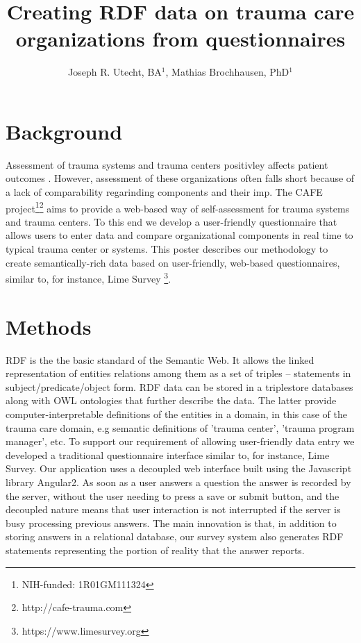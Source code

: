 \documentclass{amia}
\begin{document}
\title{Creating RDF data on trauma care organizations from questionnaires}

\author{Joseph R. Utecht, BA$^{1}$, Mathias Brochhausen, PhD$^{1}$}


\maketitle

\section*{Background}

Assessment of trauma systems and trauma centers positivley affects patient outcomes \cite{ref1, ref2}.
However, assessment of these organizations often falls short because of a lack of comparability regarinding components and their imp.
The CAFE project\footnote{NIH-funded: 1R01GM111324}\footnote{http://cafe-trauma.com} aims to provide a web-based way of self-assessment for trauma systems and trauma centers. 
To this end we develop a user-friendly questionnaire that allows users to enter data and compare organizational components in real time to typical trauma center or systems.
This poster describes our methodology to create semantically-rich data based on user-friendly, web-based questionnaires, similar to, for instance, Lime Survey \footnote{https://www.limesurvey.org}. 

\section*{Methods}
RDF is the the basic standard of the Semantic Web. It allows the linked representation of entities relations among them as a set of triples -- statements in subject/predicate/object form. RDF data can be stored in a triplestore databases along with OWL ontologies that further describe the data. The latter provide computer-interpretable definitions of the entities in  a domain, in this case of the trauma care domain, e.g semantic definitions of 'trauma center', 'trauma program manager', etc. 
To support our requirement of allowing user-friendly data entry we developed a traditional questionnaire interface similar to, for instance, Lime Survey\cite{TODO}. 
Our application uses a decoupled web interface built using the Javascript library Angular2\cite{TODO}.
As soon as a user answers a question the answer is recorded by the server, without the user needing to press a save or submit button, and the decoupled nature means that user interaction is not interrupted if the server is busy processing previous answers.
The main innovation is that, in addition to storing answers in a relational database, our survey system also generates RDF statements representing the portion of reality that the answer reports.
\end{document}
